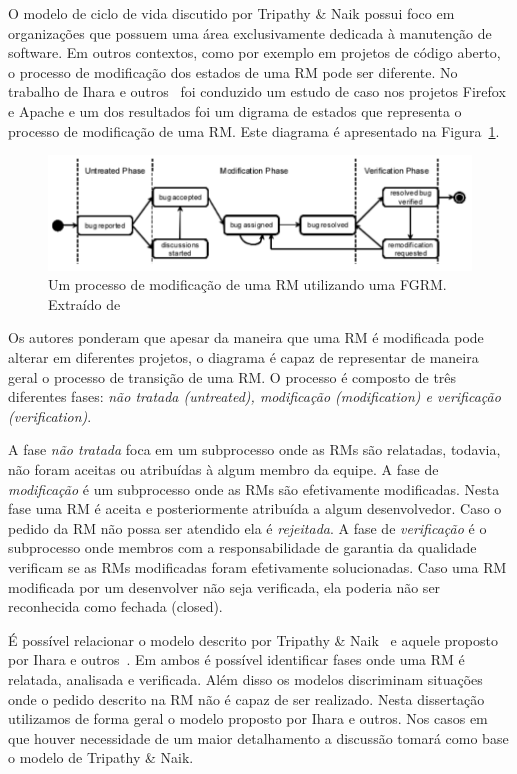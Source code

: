O modelo de ciclo de vida discutido por Tripathy \& Naik possui foco em
organizações que possuem uma área exclusivamente dedicada à manutenção de
software. Em outros contextos, como por exemplo em projetos de código aberto, o
processo de modificação dos estados de uma RM pode ser diferente. No trabalho de
Ihara e outros~\cite{ihara2009analysis} foi conduzido um estudo de caso nos
projetos Firefox e Apache e um dos resultados foi um digrama de estados que
representa o processo de modificação de uma RM\@. Este diagrama é apresentado na
Figura~\ref{fig:diagrama-estado-rm-codigo-aberto}.

\begin{figure}[htpb]
	\centering
	\includegraphics[width=0.8\linewidth]{./chapter-manutencao-software-visao-geral/img/diagrama-estado-rm-codigo-aberto.pdf}
	\caption{Um processo de modificação de uma RM utilizando uma FGRM\@. Extraído
	de~\cite{ihara2009analysis}}
\label{fig:diagrama-estado-rm-codigo-aberto}
\end{figure}

Os autores ponderam que apesar da maneira que uma RM é modificada pode alterar
em diferentes projetos, o diagrama é capaz de representar de maneira geral o
processo de transição de uma RM\@. O processo é composto de três diferentes
fases: \textit{não tratada (untreated), modificação (modification) e verificação
    (verification)}.

A fase \textit{não tratada} foca em um subprocesso onde as RMs são relatadas,
todavia, não foram aceitas ou atribuídas à algum membro da equipe. A fase de
\textit{modificação} é um subprocesso onde as RMs são efetivamente modificadas.
Nesta fase uma RM é aceita e posteriormente atribuída a algum desenvolvedor.
Caso o pedido da RM não possa ser atendido ela é \textit{rejeitada}.  A fase de
\textit{verificação} é o subprocesso onde membros com a responsabilidade de
garantia da qualidade verificam se as RMs modificadas foram efetivamente
solucionadas. Caso uma RM modificada por um desenvolver não seja verificada, ela
poderia não ser reconhecida como fechada (closed).

É possível relacionar o modelo descrito por Tripathy \&
Naik~\cite{tripathy2014software} e aquele proposto por Ihara e
outros~\cite{ihara2009analysis}. Em ambos é possível identificar fases onde uma
RM é relatada, analisada e verificada. Além disso os modelos discriminam
situações onde o pedido descrito na RM não é capaz de ser realizado. Nesta
dissertação utilizamos de forma geral o modelo proposto por Ihara e outros. Nos
casos em que houver necessidade de um maior detalhamento a discussão tomará como
base o modelo de Tripathy \& Naik.

